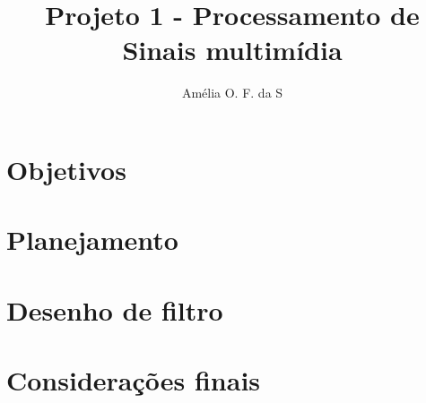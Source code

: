\documentclass{article}
\title{Projeto 1 - Processamento de Sinais multimídia}
\author{Amélia O. F. da S}
\date{}
\begin{document}
\maketitle

\section{Objetivos}

\section{Planejamento}

\section{Desenho de filtro}

\section{Considerações finais}

\end{document}
